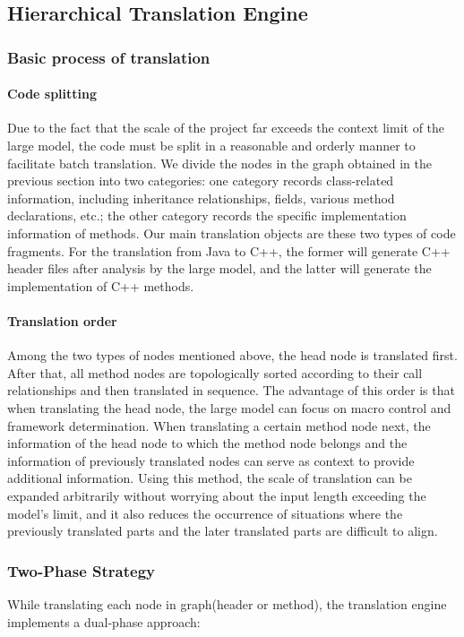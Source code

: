 \subsection{Hierarchical Translation Engine}

\subsubsection{Basic process of translation}
\paragraph{Code splitting} Due to the fact that the scale of the project far exceeds the context limit of the large model, the code must be split in a reasonable and orderly manner to facilitate batch translation. We divide the nodes in the graph obtained in the previous section into two categories: one category records class-related information, including inheritance relationships, fields, various method declarations, etc.; the other category records the specific implementation information of methods. Our main translation objects are these two types of code fragments. For the translation from Java to C++, the former will generate C++ header files after analysis by the large model, and the latter will generate the implementation of C++ methods. 
\paragraph{Translation order}
Among the two types of nodes mentioned above, the head node is translated first. After that, all method nodes are topologically sorted according to their call relationships and then translated in sequence. The advantage of this order is that when translating the head node, the large model can focus on macro control and framework determination. When translating a certain method node next, the information of the head node to which the method node belongs and the information of previously translated nodes can serve as context to provide additional information. Using this method, the scale of translation can be expanded arbitrarily without worrying about the input length exceeding the model's limit, and it also reduces the occurrence of situations where the previously translated parts and the later translated parts are difficult to align.

\subsubsection{Two-Phase Strategy}
While translating each node in graph(header or method), the translation engine implements a dual-phase approach:

